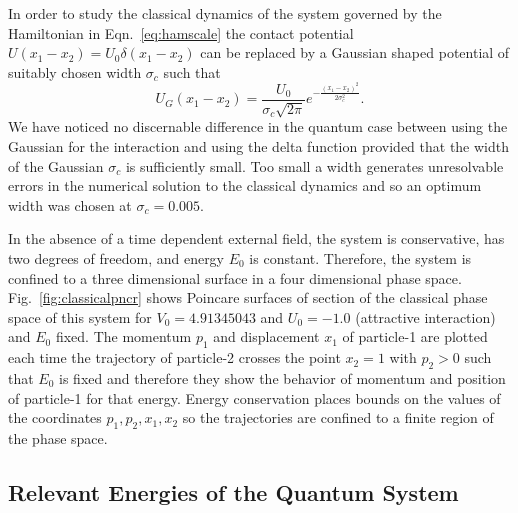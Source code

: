 \documentclass{article}
\begin{document}
In order to study the classical dynamics of the system governed by the Hamiltonian in 
Eqn.~\eqref{eq:hamscale} the contact potential $U(x_1-x_2)=U_0 \delta(x_1-x_2)$ can be replaced by   a Gaussian shaped potential of suitably chosen width $\sigma_c$ such that 
%
\begin{equation}
U_G(x_1-x_2)=\frac{U_0}{\sigma_c \sqrt{2\pi}} e^{-\frac{(x_1-x_2)^2}{2\sigma^2_c}}.
\end{equation}
%
We have noticed no discernable difference in the quantum case between using the Gaussian for the interaction and using the delta function provided that the width of the  Gaussian $\sigma_c$ is sufficiently small. Too small a width generates unresolvable errors in the numerical solution to the classical dynamics and so an optimum width was chosen at $\sigma_c = 0.005$. 

In the absence of a time dependent external field, the system is conservative, has two degrees of freedom, and energy  $E_0$ is constant. Therefore,  the system is confined to a three dimensional surface in a four dimensional phase space. Fig.~\ref{fig:classicalpncr} shows Poincare surfaces of section of the classical phase space of this system for $V_0 = 4.91345043$ and $U_0 = -1.0 $ (attractive interaction) and $E_0$ fixed. The momentum $p_1$ and displacement $x_1$ of particle-1 are plotted each time the trajectory of particle-2 crosses the point  $x_2 = 1$  with $p_2 > 0$ such that $E_0$ is fixed and therefore they show the behavior of  momentum and position of particle-1 for that energy. Energy conservation places bounds on the values of  the coordinates $p_1, p_2, x_1, x_2$ so the trajectories are confined to a finite region of the phase space.

%
%
\subsection{Relevant Energies of the Quantum System}
%
%
\end{document}
